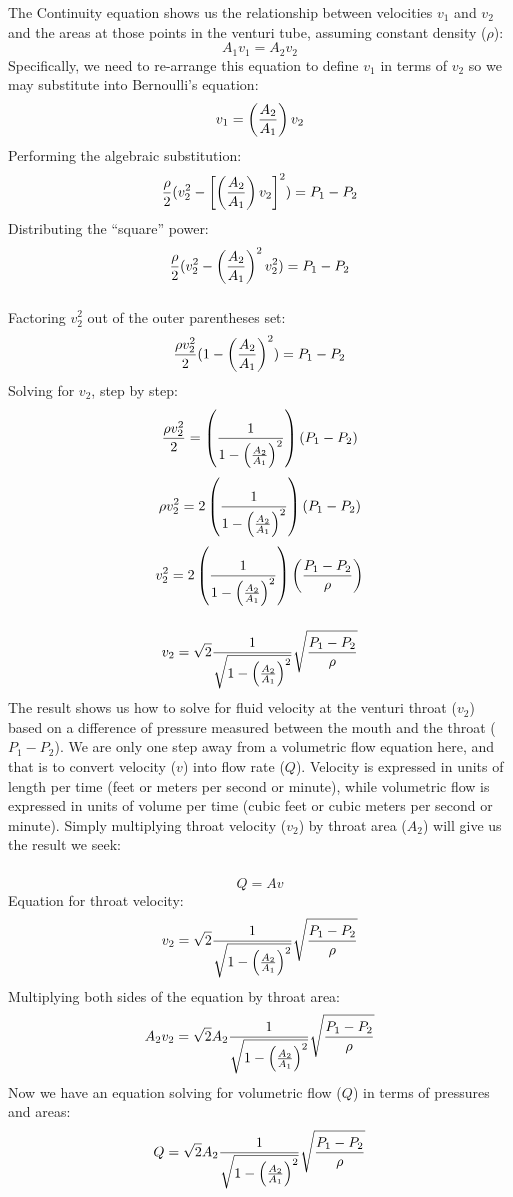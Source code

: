 \documentclass{beamer}
\begin{document}
\begin{frame}
	\frametitle{}

	



The Continuity equation shows us the relationship between velocities $v_1$ and $v_2$ and the areas at those points in the venturi tube, assuming constant density ($\rho$):
%
$$A_1 v_1 = A_2 v_2$$
%
Specifically, we need to re-arrange this equation to define $v_1$ in terms of $v_2$ so we may substitute into Bernoulli's equation:
%
$$v_1 = \left({A_2 \over A_1}\right) v_2$$
%
Performing the algebraic substitution:
%
$${\rho \over 2} (v_2^2 - \left[\left({A_2 \over A_1}\right) v_2\right]^2) = P_1 - P_2$$
%
Distributing the ``square'' power:
%
$${\rho \over 2} (v_2^2 - \left({A_2 \over A_1}\right)^2 v_2^2) = P_1 - P_2$$
%
\end{frame}
\begin{frame}
	\frametitle{}

	


%
Factoring $v_2^2$ out of the outer parentheses set:
%
$${\rho v_2^2 \over 2} (1 - \left({A_2 \over A_1}\right)^2) = P_1 - P_2$$
%
Solving for $v_2$, step by step:
%
$${\rho v_2^2 \over 2} = \left({1 \over {1 - \left({A_2 \over A_1}\right)^2}}\right) (P_1 - P_2)$$
%
$$\rho v_2^2 = 2 \left({1 \over {1 - \left({A_2 \over A_1}\right)^2}}\right) (P_1 - P_2)$$
%
$$v_2^2 = 2 \left({1 \over {1 - \left({A_2 \over A_1}\right)^2}}\right) \left({{P_1 - P_2} \over \rho}\right)$$
%
\end{frame}
\begin{frame}
	\frametitle{}

	



$$v_2 = \sqrt{2} {1 \over \sqrt{1 - \left({A_2 \over A_1}\right)^2}} \sqrt{{P_1 - P_2} \over \rho}$$
%
The result shows us how to solve for fluid velocity at the venturi throat ($v_2$) based on a difference of pressure measured between the mouth and the throat ($P_1 - P_2$).  We are only one step away from a volumetric flow equation here, and that is to convert velocity ($v$) into flow rate ($Q$).  Velocity is expressed in units of length per time (feet or meters per second or minute), while volumetric flow is expressed in units of volume per time (cubic feet or cubic meters per second or minute).  Simply multiplying throat velocity ($v_2$) by throat area ($A_2$) will give us the result we seek:
%
\end{frame}
%
\begin{frame}
	\frametitle{}

	


%
$$Q = Av$$
%
Equation for throat velocity:
%
$$v_2 = \sqrt{2} {1 \over \sqrt{1 - \left({A_2 \over A_1}\right)^2}} \sqrt{{P_1 - P_2} \over \rho}$$
%
Multiplying both sides of the equation by throat area:
%
$$A_2 v_2 = \sqrt{2} A_2 {1 \over \sqrt{1 - \left({A_2 \over A_1}\right)^2}} \sqrt{{P_1 - P_2} \over \rho}$$
%
%
Now we have an equation solving for volumetric flow ($Q$) in terms of pressures and areas:
%
$$Q = \sqrt{2} A_2 {1 \over \sqrt{1 - \left({A_2 \over A_1}\right)^2}} \sqrt{{P_1 - P_2} \over \rho}$$
%
\end{frame}
\end{document}
